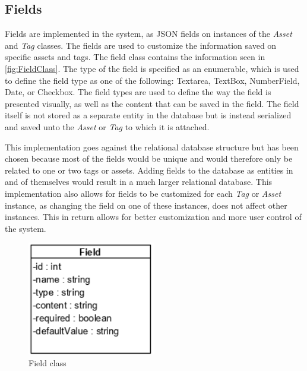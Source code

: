 \subsection{Fields}
Fields are implemented in the system, as JSON fields on instances of the \textit{Asset} and \textit{Tag} classes. The fields are used to customize the information saved on specific assets and tags. The field class contains the information seen in \autoref{fig:FieldClass}. The type of the field is specified as an enumerable, which is used to define the field type as one of the following: Textarea, TextBox, NumberField, Date, or Checkbox. The field types are used to define the way the field is presented visually, as well as the content that can be saved in the field. The field itself is not stored as a separate entity in the database but is instead serialized and saved unto the \textit{Asset} or \textit{Tag} to which it is attached.
\par
This implementation goes against the relational database structure but has been chosen because most of the fields would be unique and would therefore only be related to one or two tags or assets. Adding fields to the database as entities in and of themselves would result in a much larger relational database. This implementation also allows for fields to be customized for each \textit{Tag} or \textit{Asset} instance, as changing the field on one of these instances, does not affect other instances. This in return allows for better customization and more user control of the system.

\begin{figure}[H]
    \centering
    \includegraphics[width=0.5\textwidth]{figures/Classes/FieldAttributes.png}
    \caption{Field class}
    \label{fig:FieldClass}
\end{figure}